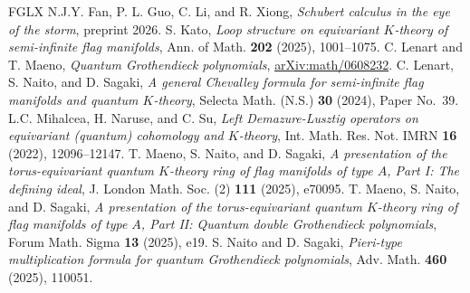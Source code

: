 \documentclass[11pt,a4paper,reqno]{amsart}
\numberwithin{equation}{section}
\theoremstyle{definition}
\begin{document}
\begin{thebibliography}{FGLX}
 N.J.Y. Fan, P. L. Guo, C. Li, and R. Xiong,
\emph{Schubert calculus in the eye of the storm}, preprint 2026.   
 S. Kato, 
\emph{Loop structure on equivariant \(K\)-theory of semi-infinite flag manifolds},
Ann. of Math. \textbf{202} (2025), 1001--1075.
 C. Lenart and T. Maeno, \emph{Quantum Grothendieck polynomials},
\href{https://arxiv.org/abs/math/0608232}{arXiv:math/0608232}.
 C. Lenart, S. Naito, and D. Sagaki,
\emph{A general Chevalley formula for semi-infinite flag manifolds and quantum \(K\)-theory},
Selecta Math. (N.S.) \textbf{30} (2024), Paper No.~39.
 L.C. Mihalcea, H. Naruse, and C. Su, 
\emph{Left Demazure-Lusztig operators on equivariant (quantum) cohomology and \(K\)-theory},
Int. Math. Res. Not. IMRN \textbf{16} (2022), 12096--12147. 
 T. Maeno, S. Naito, and D. Sagaki,
\emph{A presentation of the torus-equivariant quantum \(K\)-theory ring of flag manifolds of type \(A\), Part I: The defining ideal},
J. London Math. Soc. (2) \textbf{111} (2025), e70095.
 T. Maeno, S. Naito, and D. Sagaki,
\emph{A presentation of the torus-equivariant quantum \(K\)-theory ring of flag manifolds of type \(A\), Part II: Quantum double Grothendieck polynomials},
Forum Math. Sigma \textbf{13} (2025), e19.
 S. Naito and D. Sagaki, \emph{Pieri-type multiplication formula for quantum Grothendieck polynomials},
Adv. Math. \textbf{460} (2025), 110051.
\end{thebibliography}
\end{document}
